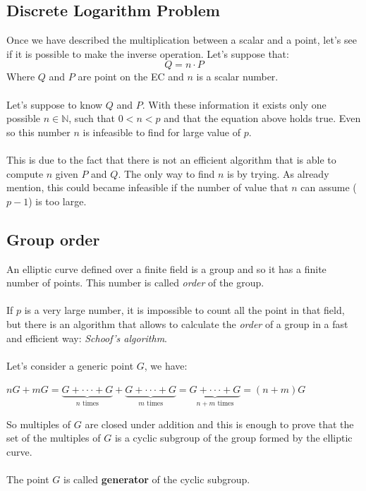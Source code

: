 \subsection{Discrete Logarithm Problem}
Once we have described the multiplication between a scalar and a point, let's see if it is possible to make the inverse operation. Let's suppose that:
\begin{equation*}
Q = n \cdot P
\end{equation*}
Where $Q$ and $P$ are point on the EC and $n$ is a scalar number. 
\\ \\ 
Let's suppose to know $Q$ and $P$. With these information it exists only one possible $n \in \mathbb{N}$, such that $0<n<p$ and that the equation above holds true. Even so this number $n$ is infeasible to find for large value of $p$.
\\ \\
This is due to the fact that there is not an efficient algorithm that is able to compute $n$ given $P$ and $Q$. The only way to find $n$ is by trying. As already mention, this could became infeasible if the number of value that $n$ can assume ($p-1$) is too large.

\subsection{Group order}
An elliptic curve defined over a finite field is a group and so it has a finite number of points. This number is called \textit{order} of the group.
\\ \\
If $p$ is a very large number, it is impossible to count all the point in that field, but there is an algorithm that allows to calculate the \textit{order} of a group in a fast and efficient way: \textit{Schoof's algorithm}.
\\ \\
Let's consider a generic point $G$, we have:
\begin{center} 
	$ nG+mG=\underbrace{
		G+\cdot \cdot \cdot+G
	}_{n\text{ times}}+
	\underbrace{
		G+\cdot \cdot \cdot+G
	}_{m\text{ times}}=
	\underbrace{
		G+\cdot \cdot \cdot+G
	}_{n+m\text{ times}} = 
	(n+m)G$
\end{center}
So multiples of $G$ are closed under addition and this is enough to prove that the set of the multiples of $G$ is a cyclic subgroup of the group formed by the elliptic curve.
\\ \\
The point $G$ is called \textbf{generator} of the cyclic subgroup.

